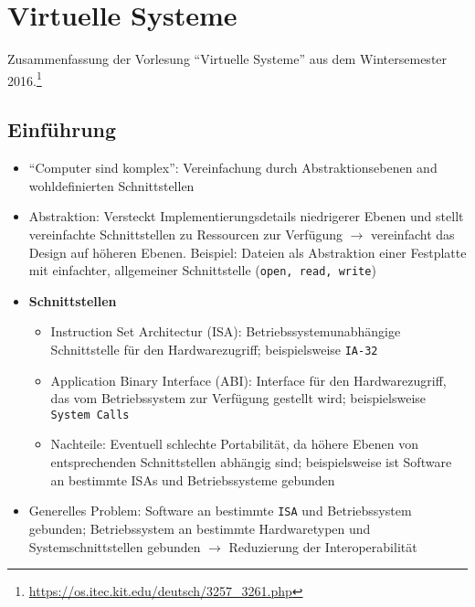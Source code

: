 \chapter{Virtuelle Systeme}

Zusammenfassung der Vorlesung "`Virtuelle Systeme"' aus dem Wintersemester 2016.\footnote{\url{https://os.itec.kit.edu/deutsch/3257_3261.php}}

\section{Einführung}
\begin{itemize}
	\item "`Computer sind komplex"': Vereinfachung durch Abstraktionsebenen and wohldefinierten Schnittstellen
	\item Abstraktion: Versteckt Implementierungsdetails niedrigerer Ebenen und stellt vereinfachte Schnittstellen zu Ressourcen zur Verfügung \(\rightarrow\) vereinfacht das Design auf höheren Ebenen. Beispiel: Dateien als Abstraktion einer Festplatte mit einfachter, allgemeiner Schnittstelle (\texttt{open, read, write})
	\item \textbf{Schnittstellen}
	\begin{itemize}
		\item Instruction Set Architectur (ISA): Betriebssystemunabhängige Schnittstelle für den Hardwarezugriff; beispielsweise \texttt{IA-32}
		\item Application Binary Interface (ABI): Interface für den Hardwarezugriff, das vom Betriebssystem zur Verfügung gestellt wird; beispielsweise \texttt{System Calls}
		\item Nachteile: Eventuell schlechte Portabilität, da höhere Ebenen von entsprechenden Schnittstellen abhängig sind; beispielsweise ist Software an bestimmte ISAs und Betriebssysteme gebunden
	\end{itemize}
	\item Generelles Problem: Software an bestimmte \texttt{ISA} und Betriebssystem gebunden; Betriebssystem an bestimmte Hardwaretypen und Systemschnittstellen gebunden \(\rightarrow\) Reduzierung der Interoperabilität
\end{itemize}


